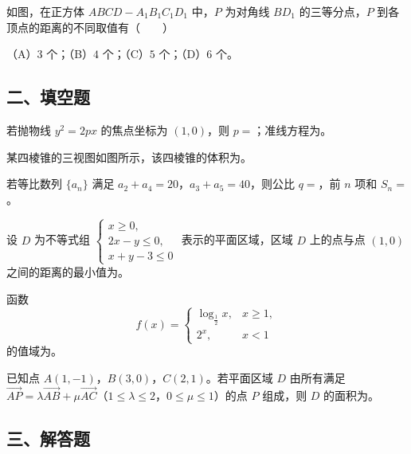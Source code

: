 \begin{question}
如图，在正方体 $ABCD-A_1B_1C_1D_1$ 中，$P$ 为对角线 $BD_1$ 的三等分点，$P$ 到各顶点的距离的不同取值有\mbox{（　　）}
\nopagebreak[4]
\begin{center}\end{center}
\nopagebreak[4]
（A）$3$ 个；（B）$4$ 个；（C）$5$ 个；（D）$6$ 个。

\end{question}
\begingroup
\renewcommand{\gkpart}[1]{\Needspace{0.3\textheight}\subsection*{#1}\nopagebreak}
\gkpart{二、填空题}
\endgroup

\begin{question}
若抛物线 $y^2=2px$ 的焦点坐标为 $(1,0)$，则 $p=$\gkblank{}；准线方程为\gkblank{}。

\Needspace{0.4\textheight}
\end{question}
\begin{question}
某四棱锥的三视图如图所示，该四棱锥的体积为\gkblank{}。
\nopagebreak[4]
\begin{center}\end{center}
\nopagebreak[4]
\end{question}
\begin{question}
若等比数列 $\{a_n\}$ 满足 $a_2+a_4=20$，$a_3+a_5=40$，则公比 $q=$\gkblank{}，前 $n$ 项和 $S_n=$\gkblank{}。

\end{question}
\begin{question}
设 $D$ 为不等式组 $\begin{cases}x\geqslant0,\\2x-y\leqslant0,\\x+y-3\leqslant0\end{cases}$ 表示的平面区域，区域 $D$ 上的点与点 $(1,0)$ 之间的距离的最小值为\gkblank{}。

\end{question}
\begin{question}
函数
\nopagebreak[4]
\[f(x)=\begin{cases}\log_{\frac12}x,&x\geqslant1,\\2^x,&x<1\end{cases}\]
的值域为\gkblank{}。

\end{question}
\begin{question}
已知点 $A(1,-1)$，$B(3,0)$，$C(2,1)$。若平面区域 $D$ 由所有满足 $\overrightarrow{AP}=\lambda\overrightarrow{AB}+\mu\overrightarrow{AC}$（$1\leqslant\lambda\leqslant2$，$0\leqslant\mu\leqslant1$）的点 $P$ 组成，则 $D$ 的面积为\gkblank{}。

\end{question}
\begingroup
\renewcommand{\gkpart}[1]{\Needspace{0.3\textheight}\subsection*{#1}\nopagebreak}
\gkpart{三、解答题}
\endgroup

